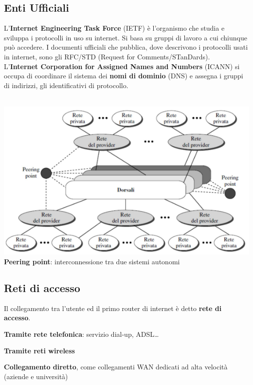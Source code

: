 \documentclass[10pt]{article}
\begin{document}
\subsection{Enti Ufficiali} L'\textbf{Internet Engineering Task Force} (IETF) è l'organismo che studia e sviluppa i protocolli in uso su internet. Si basa su gruppi di lavoro a cui chiunque può accedere. I documenti ufficiali che pubblica, dove descrivono i protocolli usati in internet, sono gli RFC/STD (Request for Comments/STanDards).\\
L'\textbf{Internet Corporation for Assigned Names and Numbers} (ICANN) si occupa di coordinare il sistema dei \textbf{nomi di dominio} (DNS) e assegna i gruppi di indirizzi, gli identificativi di protocollo.\\\\
\begin{center}
\includegraphics[scale=1]{internet.png}\\
\textbf{Peering point}: interconnessione tra due sistemi autonomi\\
\end{center}
\pagebreak
\subsection{Reti di accesso} Il collegamento tra l'utente ed il primo router di internet è detto \textbf{rete di accesso}.
\begin{list}{}{Può avvenire in 3 modi:}
\item \textbf{Tramite rete telefonica}: servizio dial-up, ADSL\ldots
\item \textbf{Tramite reti wireless}
\item \textbf{Collegamento diretto}, come collegamenti WAN dedicati ad alta velocità (aziende e università)
\end{list}
\end{document}
